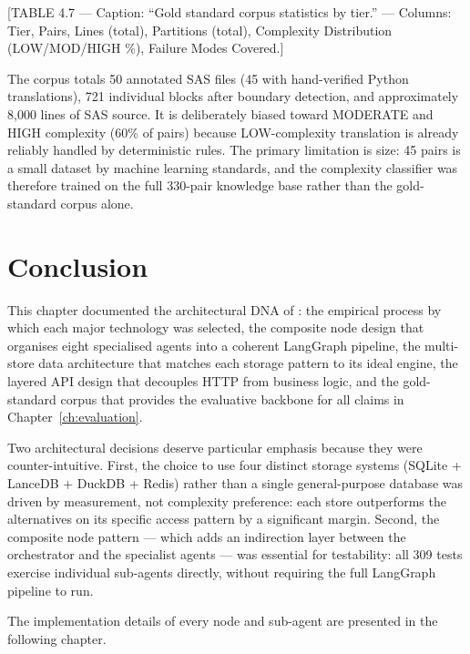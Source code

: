 [TABLE 4.7 --- Caption: ``Gold standard corpus statistics by tier.'' ---
Columns: Tier, Pairs, Lines (total), Partitions (total), Complexity Distribution
(LOW/MOD/HIGH \%), Failure Modes Covered.]

The corpus totals 50 annotated SAS files (45 with hand-verified Python
translations), 721 individual blocks after boundary detection, and approximately
8,000 lines of SAS source. It is deliberately biased toward MODERATE and HIGH
complexity (60\% of pairs) because LOW-complexity translation is already reliably
handled by deterministic rules. The primary limitation is size: 45 pairs is a
small dataset by machine learning standards, and the complexity classifier was
therefore trained on the full 330-pair knowledge base rather than the
gold-standard corpus alone.

\section{Conclusion}
\label{sec:ch4-conclusion}

This chapter documented the architectural DNA of \codara{}: the empirical
process by which each major technology was selected, the composite node design
that organises eight specialised agents into a coherent LangGraph pipeline, the
multi-store data architecture that matches each storage pattern to its ideal
engine, the layered API design that decouples HTTP from business logic, and the
gold-standard corpus that provides the evaluative backbone for all claims in
Chapter~\ref{ch:evaluation}.

Two architectural decisions deserve particular emphasis because they were
counter-intuitive. First, the choice to use four distinct storage systems
(SQLite + LanceDB + DuckDB + Redis) rather than a single general-purpose
database was driven by measurement, not complexity preference: each store
outperforms the alternatives on its specific access pattern by a significant
margin. Second, the composite node pattern --- which adds an indirection layer
between the orchestrator and the specialist agents --- was essential for
testability: all 309 tests exercise individual sub-agents directly, without
requiring the full LangGraph pipeline to run.

The implementation details of every node and sub-agent are presented in the
following chapter.

